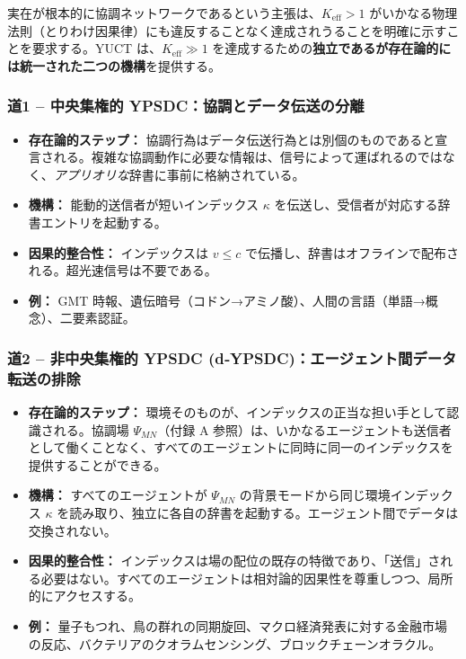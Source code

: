\documentclass[12pt,a4paper]{article}
\begin{document}
	実在が根本的に協調ネットワークであるという主張は、\(K_{\mathrm{eff}} > 1\) がいかなる物理法則（とりわけ因果律）にも違反することなく達成されうることを明確に示すことを要求する。YUCT は、\(K_{\mathrm{eff}} \gg 1\) を達成するための\textbf{独立であるが存在論的には統一された二つの機構}を提供する。
	
	\subsubsection*{道1 – 中央集権的 YPSDC：協調とデータ伝送の分離}
	\begin{itemize}[leftmargin=*]
		\item \textbf{存在論的ステップ：} 協調行為はデータ伝送行為とは別個のものであると宣言される。複雑な協調動作に必要な情報は、信号によって運ばれるのではなく、\textit{アプリオリな}辞書に事前に格納されている。
		\item \textbf{機構：} 能動的送信者が短いインデックス \(\kappa\) を伝送し、受信者が対応する辞書エントリを起動する。
		\item \textbf{因果的整合性：} インデックスは \(v \le c\) で伝播し、辞書はオフラインで配布される。超光速信号は不要である。
		\item \textbf{例：} GMT 時報、遺伝暗号（コドン→アミノ酸）、人間の言語（単語→概念）、二要素認証。
	\end{itemize}
	
	\subsubsection*{道2 – 非中央集権的 YPSDC (d‑YPSDC)：エージェント間データ転送の排除}
	\begin{itemize}[leftmargin=*]
		\item \textbf{存在論的ステップ：} 環境そのものが、インデックスの正当な担い手として認識される。協調場 \(\Psi_{MN}\)（付録 A 参照）は、いかなるエージェントも送信者として働くことなく、すべてのエージェントに同時に同一のインデックスを提供することができる。
		\item \textbf{機構：} すべてのエージェントが \(\Psi_{MN}\) の背景モードから同じ環境インデックス \(\kappa\) を読み取り、独立に各自の辞書を起動する。エージェント間でデータは交換されない。
		\item \textbf{因果的整合性：} インデックスは場の配位の既存の特徴であり、「送信」される必要はない。すべてのエージェントは相対論的因果性を尊重しつつ、局所的にアクセスする。
		\item \textbf{例：} 量子もつれ、鳥の群れの同期旋回、マクロ経済発表に対する金融市場の反応、バクテリアのクオラムセンシング、ブロックチェーンオラクル。
	\end{itemize}
	
\end{document}
